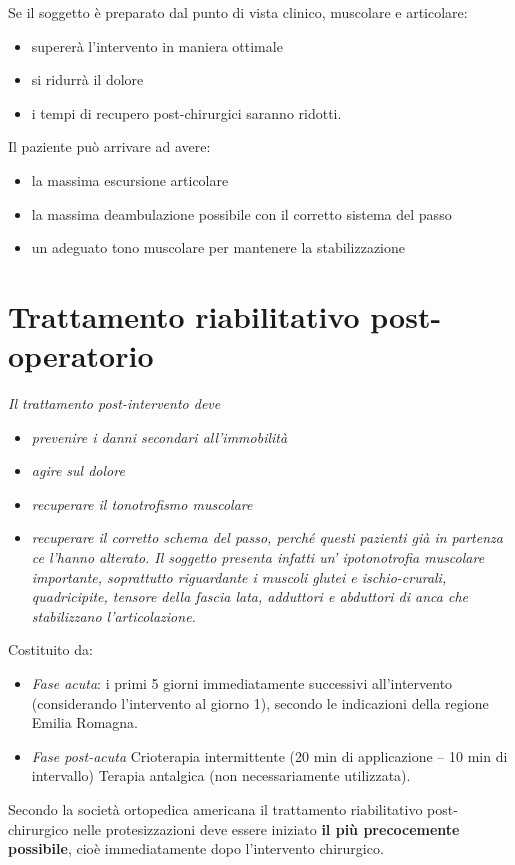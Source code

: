 Se il soggetto è preparato dal punto di vista clinico, muscolare e
articolare:


\begin{itemize}
\item
  supererà l'intervento in maniera ottimale
\item
  si ridurrà il dolore
\item
  i tempi di recupero post-chirurgici saranno ridotti.
\end{itemize}


Il paziente può arrivare ad avere:


\begin{itemize}
\item
  la massima escursione articolare
\item
  la massima deambulazione possibile con il corretto sistema del passo
\item
  un adeguato tono muscolare per mantenere la stabilizzazione
\end{itemize}

\section{Trattamento riabilitativo post-operatorio}

\emph{Il trattamento post-intervento deve}


\begin{itemize}
\item
  
  \emph{prevenire i danni secondari all'immobilità}
  
\item
  
  \emph{agire sul dolore}
  
\item
  
  \emph{recuperare il tonotrofismo muscolare}
  
\item
  \emph{recuperare il corretto schema del passo, perché questi pazienti
  già in partenza ce l'hanno alterato. Il soggetto presenta infatti un'
  ipotonotrofia muscolare importante, soprattutto riguardante i muscoli
  glutei e ischio-crurali, quadricipite, tensore della fascia lata,
  adduttori e abduttori di anca che stabilizzano l'articolazione.}
\end{itemize}


Costituito da:


\begin{itemize}
\item
  \emph{Fase acuta}: i primi 5 giorni immediatamente successivi
  all'intervento (considerando l'intervento al giorno 1), secondo le indicazioni della regione Emilia
Romagna.
\item
  \emph{Fase post-acuta} Crioterapia intermittente (20 min di applicazione -- 10 min di
intervallo) Terapia antalgica (non necessariamente utilizzata).
\end{itemize}
Secondo la società ortopedica americana il trattamento riabilitativo
post-chirurgico nelle protesizzazioni deve essere iniziato \textbf{il
più precocemente possibile}, cioè immediatamente dopo l'intervento
chirurgico.

